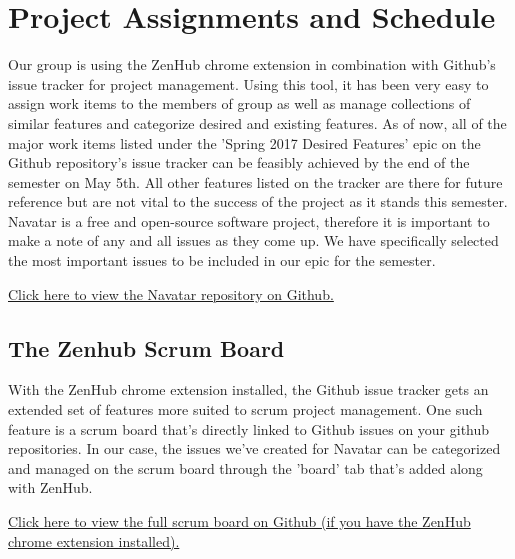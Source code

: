 \documentclass{scrreprt}
\begin{document}
\chapter{Project Assignments and Schedule}
Our group is using the ZenHub chrome extension in combination with Github's issue tracker for project management. Using this tool, it has been very easy to assign work items to the members of group as well as manage collections of similar features and categorize desired and existing features. As of now, all of the major work items listed under the 'Spring 2017 Desired Features' epic on the Github repository's issue tracker can be feasibly achieved by the end of the semester on May 5th. All other features listed on the tracker are there for future reference but are not vital to the success of the project as it stands this semester. Navatar is a free and open-source software project, therefore it is important to make a note of any and all issues as they come up. We have specifically selected the most important issues to be included in our epic for the semester.

\href{https://github.com/matthewjberger/navatar/}{Click here to view the Navatar repository on Github.}

\pagebreak

\section{The Zenhub Scrum Board}

With the ZenHub chrome extension installed, the Github issue tracker gets an extended set of features more suited to scrum project management. One such feature is a scrum board that's directly linked to Github issues on your github repositories. In our case, the issues we've created for Navatar can be categorized and managed on the scrum board through the 'board' tab that's added along with ZenHub.

\href{https://github.com/matthewjberger/navatar/issues\#boards?repos=80390803}{Click here to view the full scrum board on Github (if you have the ZenHub chrome extension installed).}
\end{document}
